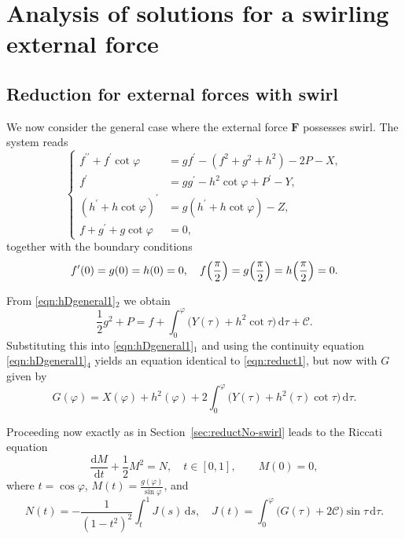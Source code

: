 \documentclass{amsart}
\newcommand{\BF}{{\boldsymbol{F}}}
\begin{document}
\section{Analysis of solutions for a swirling external force}\label{sec:withswirl}


\subsection{Reduction for external forces with swirl}\label{sec:reduct-swirl}

We now consider the general case where the external force $\BF$ possesses swirl. The system reads
\begin{equation}\label{eqn:hDgeneral1}
\left\{
\begin{aligned}
   f^{\prime\prime} + f^{\prime} \cot \varphi &= gf^{\prime} -(f^2 + g^2 + h^2) - 2P - X, \\
   f^{\prime} &= gg^{\prime} - h^2 \cot \varphi + P^{\prime} - Y, \\ 
   (h^\prime + h\cot \varphi)^{\prime} &= g(h^\prime + h\cot \varphi) - Z,\\
   f+ g^\prime + g\cot \varphi &=0,
\end{aligned}
\right.
\end{equation}
together with the boundary conditions
\begin{align*}%
f^\prime(0) = g(0) = h(0) = 0, \quad
  f\Bigl(\frac{\pi}{2}\Bigr) = g\Bigl(\frac{\pi}{2}\Bigr) = h\Bigl(\frac{\pi}{2}\Bigr) = 0.
\end{align*}

From \eqref{eqn:hDgeneral1}$_2$ we obtain 
\[
\frac12 g^{2} + P = f + \int_{0}^{\varphi}\!\bigl( Y(\tau) + h^{2}\cot\tau \bigr)\,\mathrm{d}\tau + \mathcal{C}.
\]
Substituting this into \eqref{eqn:hDgeneral1}$_1$ and using the continuity equation \eqref{eqn:hDgeneral1}$_4$ yields an equation identical to \eqref{eqn:reduct1},
but now with $G$ given by
\begin{equation}\label{eqn:genNotation}
G(\varphi) = X(\varphi) + h^{2}(\varphi) + 2\int_{0}^{\varphi} \bigl( Y(\tau) + h^{2}(\tau)\cot\tau \bigr)\,\mathrm{d}\tau .
\end{equation}

Proceeding now exactly as in Section~\ref{sec:reductNo-swirl} leads to the Riccati equation
\[
\frac{\mathrm{d}M}{\mathrm{d}t} + \frac12 M^{2} = N,\quad t\in[0,1],\qquad M(0)=0,
\]
where $t=\cos\varphi$, $M(t)=\frac{g(\varphi)}{\sin\varphi}$, and
\[
N(t) = -\frac{1}{(1-t^{2})^{2}}\int_{t}^{1} J(s)\,\mathrm{d}s,\quad
J(t) = \int_{0}^{\varphi} \bigl( G(\tau) + 2\mathcal{C} \bigr)\sin\tau\,\mathrm{d}\tau .
\]
\end{document}
